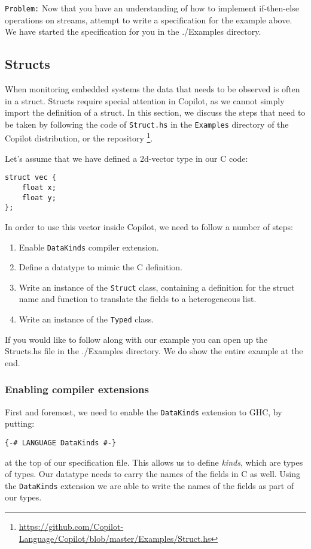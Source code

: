 {\tt Problem:} Now that you have an understanding of how to implement if-then-else
operations on streams, attempt to write a specification for the example above.
%
We have started the specification for you in the ./Examples directory.




\subsection{Structs}
When monitoring embedded systems the data that needs to be observed is often in a struct.
Structs require special attention in Copilot, as we cannot simply
import the definition of a struct. In this section, we discuss the
steps that need to be taken by following the code of \texttt{Struct.hs} in the
\texttt{Examples} directory of the Copilot distribution, or the repository
\footnote{\url{https://github.com/Copilot-Language/Copilot/blob/master/Examples/Struct.hs}}.

Let's assume that we have defined a 2d-vector type in our C code:
\begin{lstlisting}
struct vec {
	float x;
	float y;
};
\end{lstlisting}
In order to use this vector inside Copilot, we need to follow a number
of steps:
\begin{enumerate}
  \item Enable \texttt{DataKinds} compiler extension.
  \item Define a datatype to mimic the C definition.
  \item Write an instance of the \texttt{Struct} class, containing a definition
  for the struct name and function to translate the fields to a heterogeneous
    list.
  \item Write an instance of the \texttt{Typed} class.
\end{enumerate}

If you would like to follow along with our example you can open up the Structs.hs file
in the ./Examples directory. We do show the entire example at the end. 

\subsubsection*{Enabling compiler extensions}
First and foremost, we need to enable the \texttt{DataKinds} extension to GHC,
by putting:
\begin{lstlisting}[language=Copilot]
{-# LANGUAGE DataKinds #-}
\end{lstlisting}
at the top of our specification file. This allows us to define \emph{kinds},
which are types of types. Our datatype needs to carry the names of the
fields in C as well. Using the \texttt{DataKinds} extension we are able to
write the names of the fields as part of our types.


